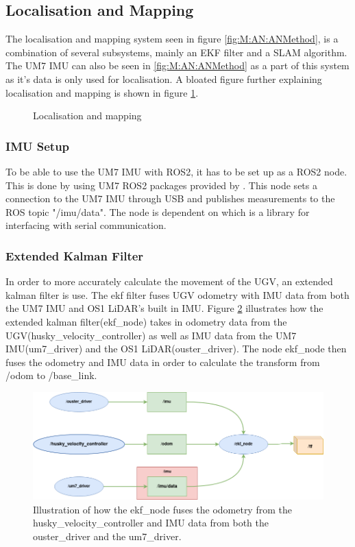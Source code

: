\subsection{Localisation and Mapping} \label{sec:M:AN:LocalisationAndMapping}
The localisation and mapping system seen in figure \ref{fig:M:AN:ANMethod}, is a combination of several subsystems, mainly an EKF filter and a SLAM algorithm. The UM7 IMU can also be seen in \ref{fig:M:AN:ANMethod} as a part of this system as it's data is only used for localisation. A bloated figure further explaining localisation and mapping is shown in figure \ref{fig:M:AN:LAM:LocMapping}.

\begin{figure}[htp]
    \centering
    
    \caption{Localisation and mapping}
    \label{fig:M:AN:LAM:LocMapping}
\end{figure}


\subsubsection{IMU Setup} 
To be able to use the UM7 IMU with ROS2, it has to be set up as a ROS2 node. This is done by using UM7 ROS2 packages provided by \cite{um7_repo}. This node sets a connection to the UM7 IMU through USB and publishes measurements to the ROS topic "/imu/data". The node is dependent on \cite{serial_repo} which is a library for interfacing with serial communication.


 \subsubsection{Extended Kalman Filter}
In order to more accurately calculate the movement of the UGV, an extended kalman filter is use. The ekf filter fuses UGV odometry with IMU data from both the UM7 IMU and OS1 LiDAR's built in IMU. Figure \ref{fig:rqt_ekf} illustrates how the extended kalman filter(ekf\_node) takes in odometry data from the UGV(husky\_velocity\_controller) as well as IMU data from the UM7 IMU(um7\_driver) and the OS1 LiDAR(ouster\_driver). The node ekf\_node then fuses the odometry and IMU data in order to calculate the transform from /odom to /base\_link.

\begin{figure}[htp]
  \centering
  \includegraphics[width = 1\textwidth]{Figures/husky_nodess.drawio.png}
  \caption{Illustration of how the ekf\_node fuses the odometry from the husky\_velocity\_controller and IMU data from both the ouster\_driver and the um7\_driver.}
  \label{fig:rqt_ekf}
\end{figure}

